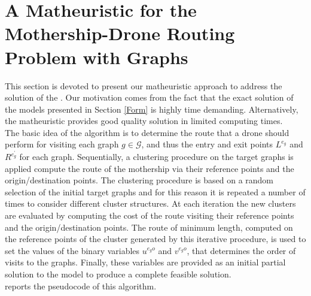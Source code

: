 \section{A Matheuristic for the Mothership-Drone Routing Problem with Graphs}\label{Math}
\noindent
This section is devoted to present our matheuristic approach to address the solution of the \AMD. Our motivation comes from the fact that the exact solution of the models presented in Section \ref{Form} is highly time demanding. Alternatively, the matheuristic provides  good quality solution in limited computing times.\\
\noindent
The basic idea of the algorithm is to determine the route that a drone should perform for visiting each graph $g \in \mathcal{G}$, and thus the entry and exit points $L^{e_{g}}$ and $R^{e^{'}_{g}}$ for each graph.
Sequentially, a clustering procedure on the target graphs is applied  compute the route of the mothership via their reference points and the origin/destination points.
The clustering procedure is based on a random selection of the initial target graphs and for this reason it is repeated a number of times to consider different cluster structures. At each iteration\RE{,} the new clusters are evaluated by computing the cost of the route visiting their reference points and the origin/destination points. 
The route of minimum length, computed on the reference points of the cluster generated by this iterative procedure, is used to set the values of the binary variables $u^{e_go}$ and $v^{e_go}$, that determines the order of visits to the graphs. Finally, these variables are provided as an initial partial solution to the \AMDCO\xspace model to produce a complete feasible solution.\\
 reports the pseudocode of this algorithm.

